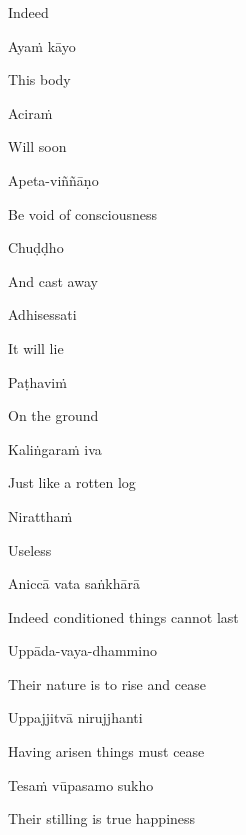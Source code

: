 \begin{english}
  Indeed
\end{english}

Ayaṁ kāyo

\begin{english}
  This body
\end{english}

Aciraṁ

\begin{english}
  Will soon
\end{english}

Apeta-viññāṇo

\begin{english}
  Be void of consciousness
\end{english}

Chuḍḍho

\begin{english}
  And cast away
\end{english}

Adhisessati

\begin{english}
  It will lie
\end{english}

Paṭhaviṁ

\begin{english}
  On the ground
\end{english}

Kaliṅgaraṁ iva

\begin{english}
  Just like a rotten log
\end{english}

Niratthaṁ

\begin{english}
  Useless\makeatletter\hyperlink{endnote105-appendix}\makeatother
\end{english}

\suttaRef{[Dhp 41]}

Aniccā vata saṅkhārā

\begin{english}
  Indeed conditioned things cannot last
\end{english}

Uppāda-vaya-dhammino

\begin{english}
  Their nature is to rise and cease\makeatletter\hyperlink{endnote106-appendix}\makeatother
\end{english}

Uppajjitvā nirujjhanti

\begin{english}
  Having arisen things must cease
\end{english}

Tesaṁ vūpasamo sukho

\begin{english}
  Their stilling is true happiness
\end{english}

\suttaRef{[Trad]}


